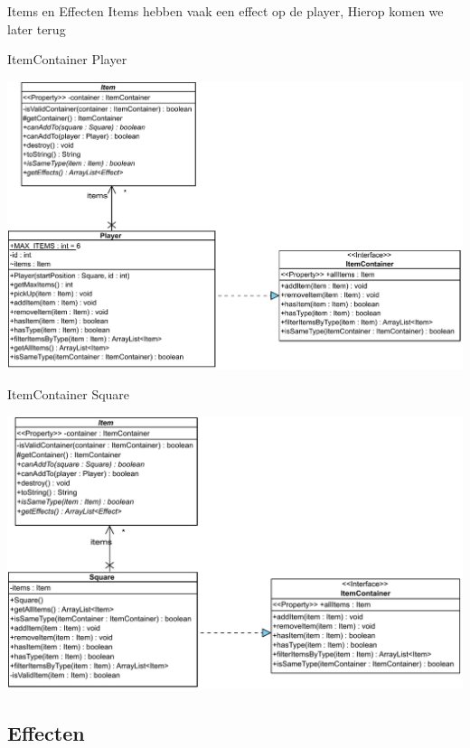 \documentclass[11pt,t]{beamer}
\begin{document}
\begin{frame}{Items en Effecten}
\vspace{1.5in}
Items hebben vaak een effect op de player, Hierop komen we later terug
\end{frame}

\begin{frame}{ItemContainer}
Player
\begin{center}
\includegraphics[width=0.85\linewidth]{images/playeritemcontainer}
\end{center}
\end{frame}

\begin{frame}{ItemContainer}
Square
\begin{center}
\includegraphics[width=0.85\linewidth]{images/squareitemcontainer}
\end{center}
\end{frame}

\subsection{Effecten}
\end{document}
